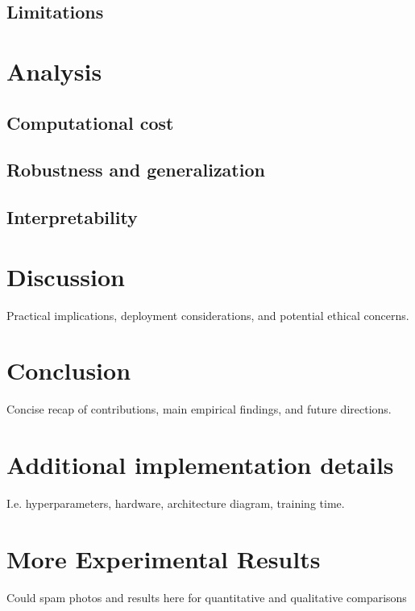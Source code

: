 \documentclass[journal]{IEEEtran}
\begin{document}
\subsection{Limitations}

\section{Analysis}
\subsection{Computational cost}

\subsection{Robustness and generalization}

\subsection{Interpretability}

\section{Discussion}
Practical implications, deployment considerations, and potential ethical concerns.

\section{Conclusion}
\label{sec:conclusion}
Concise recap of contributions, main empirical findings, and future directions.


\appendices
\section{Additional implementation details}
I.e. hyperparameters, hardware, architecture diagram, training time.

\section{More Experimental Results}
Could spam photos and results here for quantitative and qualitative comparisons


\end{document}
